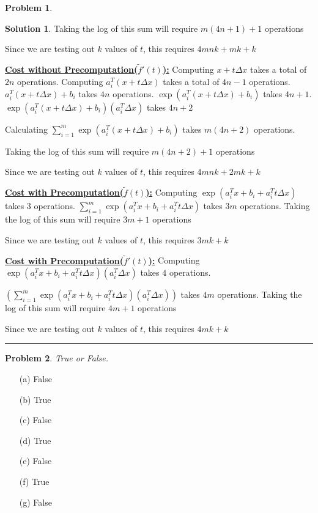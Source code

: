 \documentclass{article}
\theoremstyle{definition}
\newtheorem{problem}{Problem}
\def\fline{\rule{0.75\linewidth}{0.5pt}}
\newcommand{\finishline}{\begin{center}\fline\end{center}}
\newtheorem*{solution*}{Solution}
\newenvironment{solution}{\begin{solution*}}{{\finishline} \end{solution*}}
\begin{document}
\begin{problem}
\begin{enumerate}
\begin{solution}
        Taking the log of this sum will require $m(4n + 1) + 1$ operations
        
        Since we are testing out $k$ values of $t$, this requires $4mnk + mk + k$ \newline 
        
        \textbf{\underline{Cost without Precomputation($\tilde{f}'(t)$):}} \newline 
        Computing $x + t \Delta x$ takes a total of $2n$ operations. Computing $a_i^T(x + t \Delta x)$ takes a total of $4n - 1$ operations. $a_i^T(x + t\Delta x) + b_i$ takes $4n$ operations. $\exp(a_i^T(x + t\Delta x) + b_i)$ takes $4n + 1$. $\exp(a_i^T(x + t\Delta x) + b_i) (a_i^T \Delta x)$ takes $4n + 2$
        
        Calculating $\sum_{i=1}^{m} \exp(a_i^T(x + t\Delta x) + b_i)$ takes $m(4n + 2)$ operations.
                
        Taking the log of this sum will require $m(4n + 2) + 1$ operations
        
        Since we are testing out $k$ values of $t$, this requires $4mnk + 2mk + k$ \newline 
        
        
        \textbf{\underline{Cost with Precomputation($\tilde{f}(t)$):}} \newline 
        Computing $\exp(a_i^Tx + b_i + a_i^T t\Delta x)$ takes $3$ operations. $\sum_{i=1}^{m} \exp(a_i^Tx + b_i + a_i^T t\Delta x)$ takes $3m$ operations. Taking the log of this sum will require $3m + 1$ operations
        
        Since we are testing out $k$ values of $t$, this requires $3mk + k$ \newline 
        
        \textbf{\underline{Cost with Precomputation($\tilde{f}'(t)$):}} \newline 
        Computing $\exp(a_i^Tx + b_i + a_i^T t\Delta x) (a_i^T \Delta x)$ takes $4$ operations.
        
        $(\sum_{i=1}^{m} \exp(a_i^Tx + b_i + a_i^T t\Delta x) (a_i^T \Delta x))$ takes $4m$ operations. Taking the log of this sum will require $4m + 1$ operations
        
        Since we are testing out $k$ values of $t$, this requires $4mk + k$ \newline 
    
    \end{solution}
    
\end{enumerate}

\end{problem}

\begin{problem}
\textit{True or False.} 

\begin{enumerate}
\item[(a)] False
\item[(b)] True
\item[(c)] False
\item[(d)] True
\item[(e)] False
\item[(f)] True
\item[(g)] False
\end{enumerate}
\end{problem}
\end{document}
